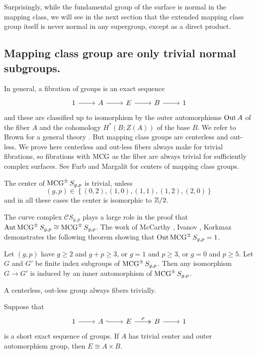 Surprisingly, while the fundamental group of the surface is
normal in the mapping class,
we will see in the next section that the extended mapping class group itself is never normal in any supergroup,
except as a direct product.


\subsection{Mapping class group are only trivial normal subgroups.}

In general, a fibration of groups is an exact sequence
$$
\begin{tikzcd}
  1 \arrow[r] &
  A \arrow[r]&
  E \arrow[r]&
  B \arrow[r]&
  1
\end{tikzcd}
$$
and these are classified up to isomorphism
by the outer automorphisms $\operatorname{Out} A$ of the fiber $A$
and the cohomology $H^\ast (B;Z(A))$ of the base $B$.
We refer to Brown for a general theory \cite{MR1324339}.
But mapping class groups are centerless and out-less.
We prove here centerless and out-less fibers always make for trivial fibrations,
so fibrations with $\operatorname{MCG}$ as the fiber are always trivial
for sufficiently complex surfaces.
See Farb and Margalit \cite{primer} for centers of mapping class groups.

\begin{theorem}
  The center of $\operatorname{MCG}^{\pm} S_{g,p}$ is trivial, unless
  $$(g,p) \in \left\{ (0,2), (1,0),(1,1),(1,2),(2,0) \right\}$$
  and in all these cases the center is isomorphic to $\mathbb{Z}/2$.
  \label{nocenter}
\end{theorem}

The curve complex $\mathcal CS_{g,p}$
plays a large role in the proof that $\operatorname{Aut} \operatorname{MCG}^{\pm}S_{g,p} \cong \operatorname{MCG}^{\pm}S_{g,p}$.
The work of McCarthy \cite{MR830038}, Ivanov \cite{MR1460387}, Korkmaz \cite{MR1696431}
demonstrates the following theorem
showing that
$\operatorname{Out} \operatorname{MCG}^{\pm}S_{g,p} = 1$.

\begin{theorem}
Let $(g,p)$ have $g\geq 2$ and $g+p \geq 3$,
or $g=1$ and $p\geq 3$, or $g=0$ and $p \geq 5$.
Let $G$ and $G'$ be finite index subgroups of $\operatorname{MCG}^\pm S_{g,p}$.
Then any isomorphism $G\to G'$ is induced by an inner automorphism of $\operatorname{MCG}^\pm S_{g,p}$.
\label{outmod}
\end{theorem}


\begin{theorem}
  A centerless, out-less group always fibers trivially.

  Suppose that
  $$
  \begin{tikzcd}
    1 \arrow[r] &
    A \arrow[hook,r]&
    E \arrow[two heads]{r}{\rho}&
    B \arrow[r]&
    1
  \end{tikzcd}
  $$
  is a short exact sequence of groups.
  If $A$ has trivial center and outer automorphism group,
  then $E \cong A \times B$.
  \label{centerout}
\end{theorem}

